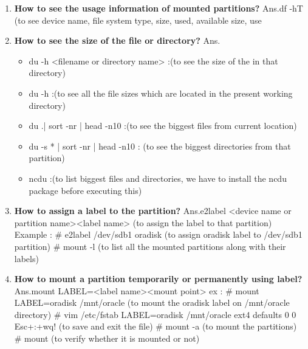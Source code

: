 \begin{enumerate}
\begin{enumerate}
  \bigskip
  \bigskip


  \item \textbf{How to see the usage information of mounted partitions?}
  \newline
  Ans.df   -hT       (to see device name, file system type, size, used, available size, use%
  
  \bigskip
  \bigskip

  \item \textbf{How to see the size of the file or directory?}
  \newline
  Ans.\begin{itemize}
         \item du   -h   <filename or directory  name> :(to see the size of the in that directory)
         \item du   -h  :(to see all the file sizes which are located in the present working directory)
         \item du  .| sort  -nr | head  -n10  :(to see the biggest files from current location)
         \item du  -s * | sort  -nr | head  -n10    : (to see the biggest directories from that partition)
         \item ncdu   :(to list biggest files and directories, we have to install the ncdu package  before executing this) 
      \end{itemize}
  
  \bigskip
  \bigskip

  \item \textbf{How to assign a label to the partition?}
  \newline
  Ans.e2label   <device name or partition name><label name>      (to assign the label to that partition)
  Example :    # e2label  /dev/sdb1  oradisk      (to assign oradisk label to /dev/sdb1 partition)
	# mount   -l       (to list all the mounted partitions along with their labels)
  
  \bigskip
  \bigskip

  \item \textbf{How to mount a partition temporarily or permanently using label?}
  \newline
  Ans.mount   LABEL=<label name><mount point> ex :  # mount   LABEL=oradisk     /mnt/oracle    (to mount the oradisk label on /mnt/oracle directory)
    # vim  /etc/fstab
    LABEL=oradisk	/mnt/oracle	ext4	defaults	0	0
    Esc+:+wq!    (to save and exit the file)
    # mount    -a       (to mount the partitions)
    # mount	(to verify whether it is mounted or not)


\end{enumerate}
\end{enumerate}
